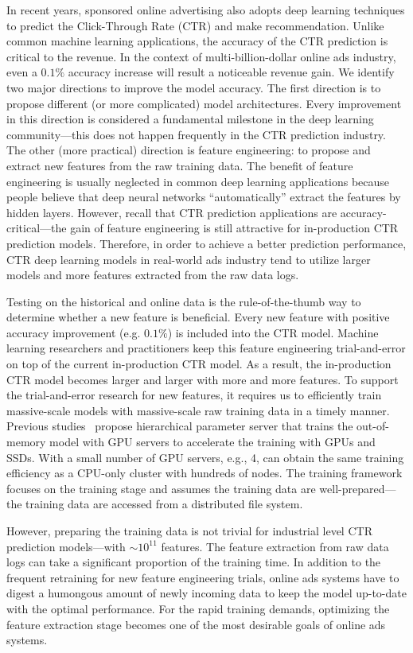 \documentclass[conference]{IEEEtran}
\begin{document}
In recent years, sponsored online advertising also adopts deep learning techniques to predict the Click-Through Rate (CTR) and make recommendation. Unlike common machine learning applications, the accuracy of the CTR prediction is critical to the revenue. In the context of multi-billion-dollar online ads industry, even a $0.1\%$ accuracy increase will result a noticeable revenue gain. 
We identify two major directions to improve the model accuracy. The first direction is to propose different (or more complicated) model architectures. Every improvement in this direction is considered a fundamental milestone in the deep learning community---this does not happen frequently in the CTR prediction industry.
The other (more practical) direction is feature engineering: to propose and extract new features from the raw training data. The benefit of feature engineering is usually neglected in common deep learning applications because people believe that deep neural networks ``automatically'' extract the features by hidden layers. However, recall that CTR prediction applications are accuracy-critical---the gain of feature engineering is still attractive for in-production CTR prediction models. 
Therefore, in order to achieve a better prediction performance, CTR deep learning models in real-world ads industry tend to utilize larger models and more features extracted from the raw data logs. 

Testing on the historical and online data is the rule-of-the-thumb way to determine whether a new feature is beneficial. Every new feature with positive accuracy improvement (e.g. $0.1\%$) is included into the CTR model. Machine learning researchers and practitioners keep this feature engineering trial-and-error on top of the current in-production CTR model. As a result, the in-production CTR model becomes larger and larger with more and more features. To support the trial-and-error research for new features, it requires us to efficiently train massive-scale models with massive-scale raw training data in a timely manner. Previous studies~\cite{???} propose hierarchical parameter server that trains the out-of-memory model with GPU servers to accelerate the training with GPUs and SSDs. With a small number of GPU servers, e.g., 4, can obtain the same training efficiency as a CPU-only cluster with hundreds of nodes. The training framework focuses on the training stage and assumes the training data are well-prepared---the training data are accessed from a distributed file system.

However, preparing the training data is not trivial for industrial level CTR prediction models---with $\sim 10^{11}$ features. The feature extraction from raw data logs can take a significant proportion of the training time. In addition to the frequent retraining for new feature engineering trials, online ads systems have to digest a humongous amount of newly incoming data to keep the model up-to-date with the optimal performance. For the rapid training demands, optimizing the feature extraction stage becomes one of the most desirable goals of online ads systems.
\end{document}
